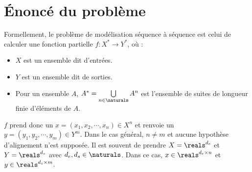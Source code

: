 \section{Énoncé du problème}

Formellement, le problème de modélisation séquence à séquence est celui de calculer une fonction partielle
\(f: X^\ast \to Y^\ast\), où :
\begin{itemize}
    \item  \(X\) est un ensemble dit d'entrées. 
    \item \(Y\) est un ensemble dit de sorties.
    \item Pour un ensemble \(A\), \(A^\ast = \bigcup\limits_{n\in\naturals}A^n\)
    est l'ensemble de suites de longueur finie d'éléments de \(A\).
\end{itemize}
\(f\) prend donc un \(x = (x_1, x_2,\cdots, x_n)\in X^n\) 
et renvoie un \(y = (y_1, y_2,\cdots, y_m)\in Y^m\).
Dans le cas général, \(n\neq m\) et aucune hypothèse d'alignement n'est supposée.
Il est souvent de prendre \(X = \reals^{d_e}\) et \(Y = \reals^{d_s}\) avec \(d_e, d_s\in\naturals\).
Dans ce cas, \(x\in \reals^{d_e\times n}\) et \(y\in \reals^{d_s\times m}\).